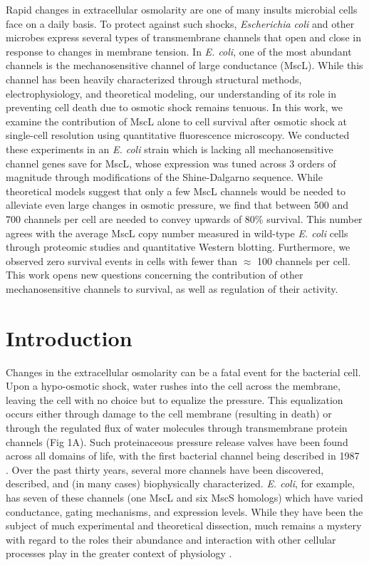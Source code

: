 \documentclass[12pt]{caltech_thesis}
\begin{document}
Rapid changes in extracellular osmolarity are one of many insults
microbial cells face on a daily basis. To protect against such shocks,
\emph{Escherichia coli} and other microbes express several types of
transmembrane channels that open and close in response to changes in
membrane tension. In \emph{E. coli}, one of the most abundant channels
is the mechanosensitive channel of large conductance (MscL). While this
channel has been heavily characterized through structural methods,
electrophysiology, and theoretical modeling, our understanding of its
role in preventing cell death due to osmotic shock remains tenuous. In
this work, we examine the contribution of MscL alone to cell survival
after osmotic shock at single-cell resolution using quantitative
fluorescence microscopy. We conducted these experiments in an \emph{E.
coli} strain which is lacking all mechanosensitive channel genes save
for MscL, whose expression was tuned across 3 orders of magnitude
through modifications of the Shine-Dalgarno sequence. While theoretical
models suggest that only a few MscL channels would be needed to
alleviate even large changes in osmotic pressure, we find that between
500 and 700 channels per cell are needed to convey upwards of 80\%
survival. This number agrees with the average MscL copy number measured
in wild-type \emph{E. coli} cells through proteomic studies and
quantitative Western blotting. Furthermore, we observed zero survival
events in cells with fewer than \(\approx\) 100 channels per cell. This
work opens new questions concerning the contribution of other
mechanosensitive channels to survival, as well as regulation of their
activity.

\hypertarget{introduction-4}{%
\section{Introduction}\label{introduction-4}}

Changes in the extracellular osmolarity can be a fatal event for the
bacterial cell. Upon a hypo-osmotic shock, water rushes into the cell
across the membrane, leaving the cell with no choice but to equalize the
pressure. This equalization occurs either through damage to the cell
membrane (resulting in death) or through the regulated flux of water
molecules through transmembrane protein channels (Fig 1A). Such
proteinaceous pressure release valves have been found across all domains
of life, with the first bacterial channel being described in 1987
\autocite{martinac1987}. Over the past thirty years, several more
channels have been discovered, described, and (in many cases)
biophysically characterized. \emph{E. coli}, for example, has seven of
these channels (one MscL and six MscS homologs) which have varied
conductance, gating mechanisms, and expression levels. While they have
been the subject of much experimental and theoretical dissection, much
remains a mystery with regard to the roles their abundance and
interaction with other cellular processes play in the greater context of
physiology
\autocite{bavi2016,bialecka-fornal2012,bialecka-fornal2015,edwards2012,naismith2012,ursell2008,vandenberg2016}.
\end{document}
